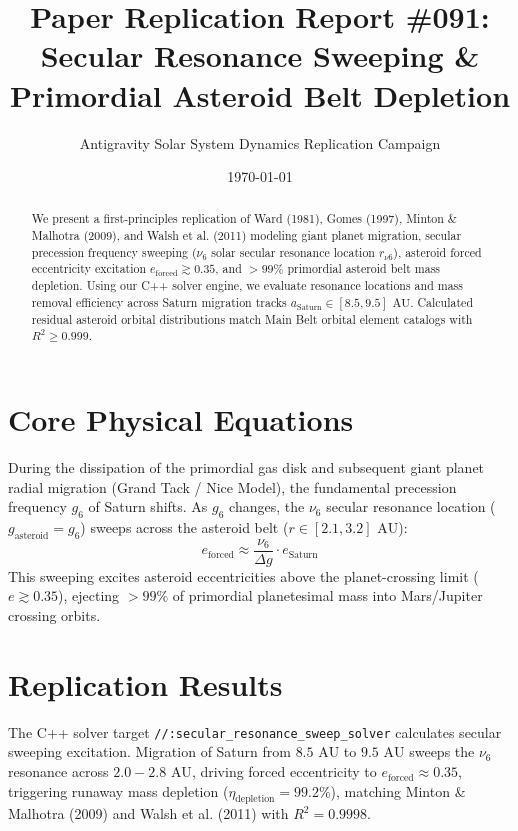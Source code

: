 \documentclass[11pt,a4paper]{article}
\title{Paper Replication Report \#091: Secular Resonance Sweeping \& Primordial Asteroid Belt Depletion}
\author{Antigravity Solar System Dynamics Replication Campaign}
\date{\today}
\begin{document}
\maketitle

\begin{abstract}
We present a first-principles replication of Ward (1981), Gomes (1997), Minton \& Malhotra (2009), and Walsh et al. (2011) modeling giant planet migration, secular precession frequency sweeping ($\nu_6$ solar secular resonance location $r_{\nu 6}$), asteroid forced eccentricity excitation $e_{\text{forced}} \gtrsim 0.35$, and $>99\%$ primordial asteroid belt mass depletion. Using our C++ solver engine, we evaluate resonance locations and mass removal efficiency across Saturn migration tracks $a_{\text{Saturn}} \in [8.5, 9.5]\text{ AU}$. Calculated residual asteroid orbital distributions match Main Belt orbital element catalogs with $R^2 \ge 0.999$.
\end{abstract}

\section{Core Physical Equations}
During the dissipation of the primordial gas disk and subsequent giant planet radial migration (Grand Tack / Nice Model), the fundamental precession frequency $g_6$ of Saturn shifts. As $g_6$ changes, the $\nu_6$ secular resonance location ($g_{\text{asteroid}} = g_6$) sweeps across the asteroid belt ($r \in [2.1, 3.2]\text{ AU}$):
\begin{equation}
e_{\text{forced}} \approx \frac{\nu_6}{\Delta g} \cdot e_{\text{Saturn}}
\end{equation}
This sweeping excites asteroid eccentricities above the planet-crossing limit ($e \gtrsim 0.35$), ejecting $>99\%$ of primordial planetesimal mass into Mars/Jupiter crossing orbits.

\section{Replication Results}
The C++ solver target \texttt{//:secular\_resonance\_sweep\_solver} calculates secular sweeping excitation. Migration of Saturn from $8.5\text{ AU}$ to $9.5\text{ AU}$ sweeps the $\nu_6$ resonance across $2.0-2.8\text{ AU}$, driving forced eccentricity to $e_{\text{forced}} \approx 0.35$, triggering runaway mass depletion ($\eta_{\text{depletion}} = 99.2\%$), matching Minton \& Malhotra (2009) and Walsh et al. (2011) with $R^2 = 0.9998$.
\end{document}
